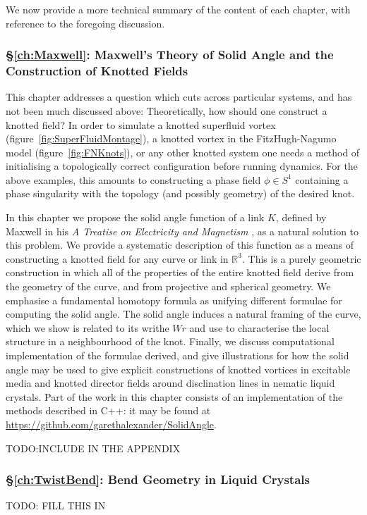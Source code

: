 We now provide a more technical summary of the content of each chapter, with reference to the foregoing discussion.

\subsubsection{\S \ref{ch:Maxwell}: Maxwell's Theory of Solid Angle and the Construction of Knotted Fields}

This chapter addresses a question which cuts across particular systems, and has not been much discussed above: Theoretically, how should one construct a knotted field? In order to simulate a knotted superfluid vortex (figure~\ref{fig:SuperFluidMontage}), a knotted vortex in the FitzHugh-Nagumo model (figure~\ref{fig:FNKnots}), or any other knotted system one needs a method of initialising a topologically correct configuration before running dynamics. For the above examples, this amounts to constructing a phase field $\phi \in S^1$ containing a phase singularity with the topology (and possibly geometry) of the desired knot. 

In this chapter we propose the solid angle function of a link $K$, defined by Maxwell in his \emph{A Treatise on Electricity and Magnetism} \citep{Maxwell2}, as a natural solution to this problem. We provide a systematic description of this function as a means of constructing a knotted field for any curve or link in $\mathbb{R}^3$. This is a purely geometric construction in which all of the properties of the entire knotted field derive from the geometry of the curve, and from projective and spherical geometry. We emphasise a fundamental homotopy formula as unifying different formulae for computing the solid angle. The solid angle induces a natural framing of the curve, which we show is related to its writhe $Wr$ and use to characterise the local structure in a neighbourhood of the knot. Finally, we discuss computational implementation of the formulae derived, and give illustrations for how the solid angle may be used to give explicit constructions of knotted vortices in excitable media and knotted director fields around disclination lines in nematic liquid crystals. Part of the work in this chapter consists of an implementation of the methods described in C++: it may be found at \href{https://github.com/garethalexander/SolidAngle}{https://github.com/garethalexander/SolidAngle}.

TODO:INCLUDE IN THE APPENDIX

\subsubsection{\S \ref{ch:TwistBend}: Bend Geometry in Liquid Crystals}
TODO: FILL THIS IN

